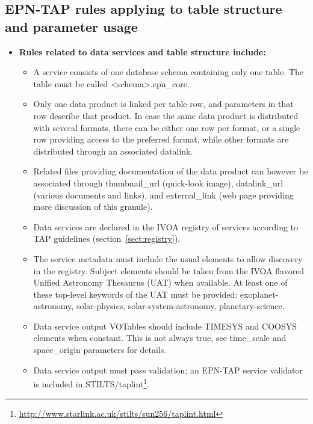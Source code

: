 \documentclass[11pt,a4paper]{ivoa}
\begin{document}
\subsection{EPN-TAP rules applying to table structure and parameter usage}


\begin{itemize}
\item \textbf{Rules related to data services and table structure include:}

\begin{itemize}
\item A service consists of one database schema containing only one table.
The table must be called <schema>.epn\_core.

\item Only one data product is linked per table row, and parameters
in that row describe that product. In case the same data product is
distributed with several formats, there can be either one row per format,
or a single row providing access to the preferred format,
while other formats are distributed through an associated datalink.


\item Related files providing documentation of the data product can
however be associated through thumbnail\_{url} (quick-look image),
datalink\_url (various documents and links), and external\_link (web
page providing more discussion of this granule).

\item Data services are declared in the IVOA registry of services
according to TAP guidelines (section~\ref{sect:registry}).

\item The service metadata must include the usual elements to allow
discovery in the registry. Subject elements should be taken from the IVOA
flavored Unified Astronomy Thesaurus (UAT) when available. At least one of
these top-level keywords of the UAT must be provided: exoplanet-astronomy,
solar-physics, solar-system-astronomy, planetary-science.

\item Data service output VOTables should include TIMESYS and COOSYS
elements when constant. This is not always true, see time\_scale  and
space\_origin parameters for details.

\item Data service output must pass validation;
an EPN-TAP service validator is included in
STILTS/taplint\footnote{\url{http://www.starlink.ac.uk/stilts/sun256/taplint.html}}.
\end{itemize}



\end{itemize}
\end{document}
